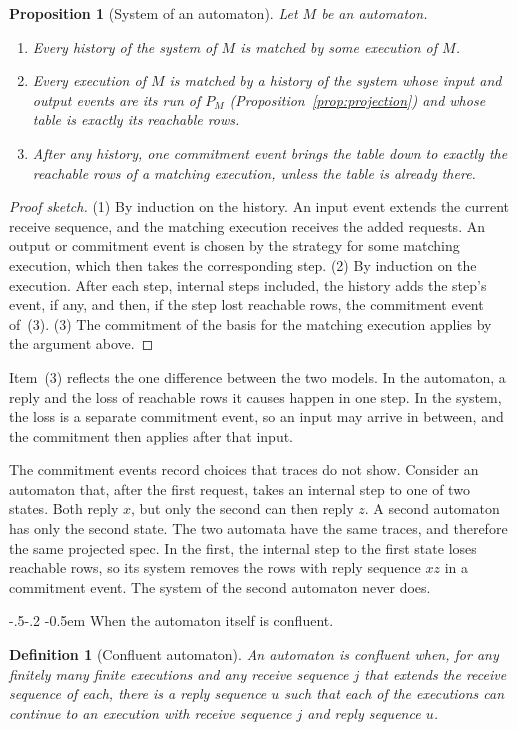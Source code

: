 \documentclass[sigconf]{cidr-2027}
\makeatletter
\newtheorem{proposition}{Proposition}
\newtheorem{definition}{Definition}
\theoremstyle{remark}
\renewcommand\paragraph{\@startsection{paragraph}{4}{\z@}%
  {-.5\baselineskip \@plus -2\p@ \@minus -.2\p@}%
  {-0.5em}%
  {\normalfont\bfseries}}
\newcommand{\commitment}{commitment\xspace}
\newcommand{\inrel}{extends\xspace}          %
\makeatother
\begin{document}
\begin{proposition}[System of an automaton]
\label{prop:automaton-system}
Let $M$ be an automaton.
\begin{enumerate}
\item
Every history of the system of $M$ is matched by some execution of
        $M$.
\item
Every execution of $M$ is matched by a history of the system whose
        input and output events are its run of $P_M$
        (Proposition~\ref{prop:projection}) and whose table is exactly its
        reachable rows.
\item
After any history, one \commitment event brings the table down to
        exactly the reachable rows of a matching execution, unless the table
        is already there.
\end{enumerate}
\end{proposition}

\begin{proof}[Proof sketch]
(1) By induction on the history. An input event extends the current receive
sequence, and the matching execution receives the added requests. An output
or \commitment event is chosen by the strategy for some matching execution,
which then takes the corresponding step. (2) By induction on the execution. After each step, internal steps included, the history adds the step's event,
if any, and then, if the step lost reachable rows, the \commitment event
of~(3). (3) The \commitment of the basis for the matching execution applies
by the argument above.
\end{proof}

Item~(3) reflects the one difference between the two models. In the
automaton, a reply and the loss of reachable rows it causes happen in one
step. In the system, the loss is a separate \commitment event, so an input
may arrive in between, and the \commitment then applies after that input.

The \commitment events record choices that traces do not show. Consider an
automaton that, after the first request, takes an internal step to one of two
states. Both reply $x$, but only the second can then reply $z$. A second
automaton has only the second state. The two automata have the same traces,
and therefore the same projected spec. In the first, the internal step to the
first state loses reachable rows, so its system removes the rows with reply
sequence $xz$ in a \commitment event. The system of the second automaton never
does.

\paragraph{When the automaton itself is confluent.}
\begin{definition}[Confluent automaton]
\label{def:confluent-automaton}
An automaton is \emph{confluent} when, for any finitely many finite executions
and any receive sequence $j$ that \inrel the receive sequence of each, there
is a reply sequence $u$ such that each of the executions can continue to an
execution with receive sequence $j$ and reply sequence $u$.
\end{definition}
\end{document}
